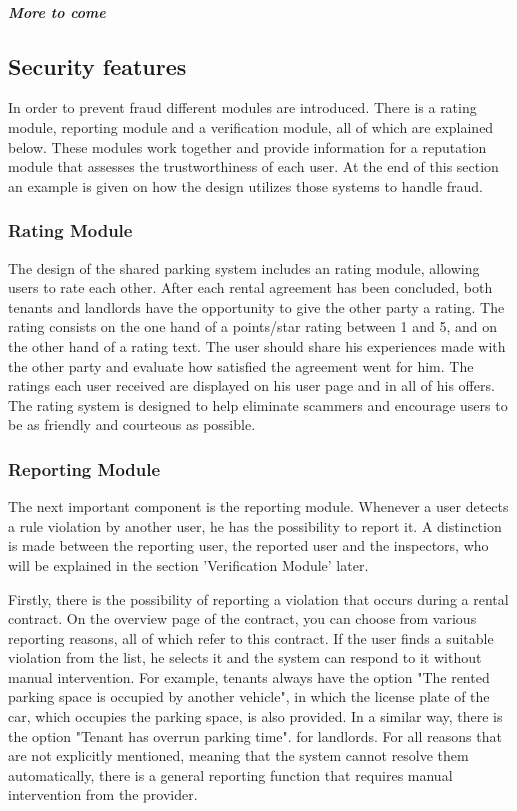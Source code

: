 \documentclass[
a4paper,     %
titlepage,   %
14pt         %
]{scrartcl}  %
\theoremstyle{mystyle}
\begin{document}
\subparagraph{More to come}
  
\subsection{Security features}
In order to prevent fraud different modules are introduced. There is a rating module, reporting module and a verification module, all of which are explained below. These modules work together and provide information for a reputation module that assesses the trustworthiness of each user. At the end of this section an example is given on how the design utilizes those systems to handle fraud.

\subsubsection{Rating Module} The design of the shared parking system includes an rating module, allowing users to rate each other. After each rental agreement has been concluded, both tenants and landlords have the opportunity to give the other party a rating. The rating consists on the one hand of a points/star rating between 1 and 5, and on the other hand of a rating text. The user should share his experiences made with the other party and evaluate how satisfied the agreement went for him. The ratings each user received are displayed on his user page and in all of his offers. The rating system is designed to help eliminate scammers and encourage users to be as friendly and courteous as possible.

\subsubsection{Reporting Module} The next important component is the reporting module. Whenever a user detects a rule violation by another user, he has the possibility to report it. A distinction is made between the reporting user, the reported user and the inspectors, who will be explained in the section 'Verification Module' later.

Firstly, there is the possibility of reporting a violation that occurs during a rental contract. On the overview page of the contract, you can choose from various reporting reasons, all of which refer to this contract. If the user finds a suitable violation from the list, he selects it and the system can respond to it without manual intervention. For example, tenants always have the option "The rented parking space is occupied by another vehicle", in which the license plate of the car, which occupies the parking space, is also provided. In a similar way, there is the option "Tenant has overrun parking time". for landlords. For all reasons that are not explicitly mentioned, meaning that the system cannot resolve them automatically, there is a general reporting function that requires manual intervention from the provider.
\end{document}
